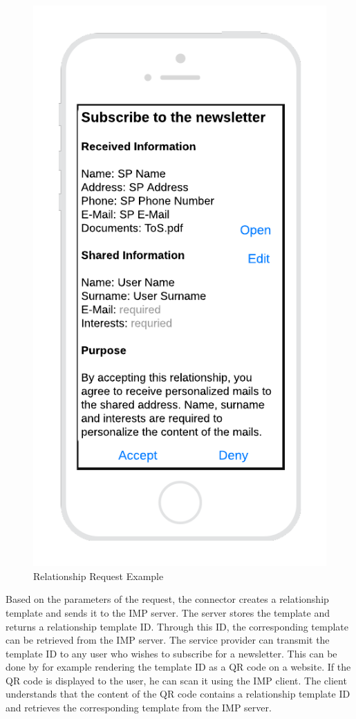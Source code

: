 \begin{figure}
    \centering
    \caption{Relationship Request Example}
    \includegraphics[scale=0.25]{Diagrams/Relationship Request Example.png}
\end{figure}

Based on the parameters of the request, the connector creates a relationship template and sends it to the IMP server. The server stores the template and returns a relationship template ID. Through this ID, the corresponding template can be retrieved from the IMP server.
The service provider can transmit the template ID to any user who wishes to subscribe for a newsletter. This can be done by for example rendering the template ID as a QR code on a website.
If the QR code is displayed to the user, he can scan it using the IMP client. The client understands that the content of the QR code contains a relationship template ID and retrieves the corresponding template from the IMP server.

